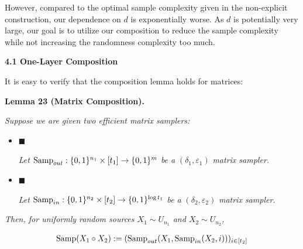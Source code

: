 However, compared to the optimal sample complexity given in the non-explicit construction, our dependence on $d$ is exponentially worse.
As $d$ is potentially very large, our goal is to utilize our composition to reduce the sample complexity while not increasing the randomness complexity too much.\par




\par\medskip\noindent\textbf{
4.1 One-Layer Composition}\par




It is easy to verify that the composition lemma holds for matrices:\par





\par\medskip\noindent\textbf{
\textbf{Lemma 23}\textbf{ }(Matrix Composition)\textbf{.}
}\par



\emph{Suppose we are given two efficient matrix samplers:}\par


\begin{itemize}


\item[] 
$\blacksquare$ 


\emph{Let }$\textup{{Samp}}_{out}:\{0,1\}^{n_{1}}\times[t_{1}]\to\{0,1\}^{m}$\emph{ be a }$(\delta_{1},\varepsilon_{1})$\emph{ matrix sampler.}\par





\item[] 
$\blacksquare$ 


\emph{Let }$\textup{{Samp}}_{in}:\{0,1\}^{n_{2}}\times[t_{2}]\to\{0,1\}^{\log t_{1}}$\emph{ be a }$(\delta_{2},\varepsilon_{2})$\emph{ matrix sampler.}\par





\end{itemize}


\emph{Then, for uniformly random sources $X_{1}\sim U_{n_{1}}$ and $X_{2}\sim U_{n_{2}}$,}\par


\[\begin{gathered}
\textup{{Samp}}(X_{1}\circ X_{2}):=(\textup{{Samp}}_{out}(X_{1},\textup{{Samp}}_{in}(X_{2},i)))_{i\in[t_{2}]}
\end{gathered}\]


